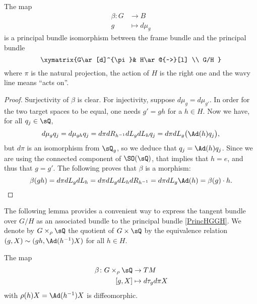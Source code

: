 \begin{proposition}
The map
\begin{equation}
\begin{aligned}
 \beta\colon G&\to B \\ 
g&\mapsto d\mu_g 
\end{aligned}
\end{equation}
is a principal bundle isomorphism between the frame bundle and the principal bundle
\begin{equation}		\label{PrincHGGH}
\xymatrix{%
   	G\ar[d]^{\pi}& H\ar@{~>}[l]		\\
   					G/H
 }
\end{equation}
where $\pi$ is the natural projection, the action of $H$ is the right one and the wavy line means ``acts on''.
\end{proposition}

\begin{proof}
Surjectivity of $\beta$ is clear. For injectivity, suppose $d\mu_g=d\mu_{g'}$. In order for the two target spaces to be equal, one needs $g'=gh$ for a $h\in H$. Now we have, for all $q_j\in\sQ$, 
\begin{equation}
  d\mu_gq_j=d\mu_{gh}q_j=d\pi dR_{h^{-1}}dL_gdL_hq_j
		=d\pi dL_g\big( \Ad(h)q_j \big),
\end{equation}
but $d\pi$ is an isomorphism from $\sQ_g$, so we deduce that $q_j=\Ad(h)q_j$. Since we are using the connected component of $\SO(\sQ)$, that implies that $h=e$, and thus that $g=g'$. The following proves that $\beta$ is a morphism:
\[ 
  \beta(gh)=d\pi dL_g dL_h=d\pi dL_g dL_h dR_{h^{-1}}=d\pi dL_g \Ad(h)=\beta(g)\cdot h.
\]
\end{proof}

The following lemma provides  a convenient way to express the tangent bundle over $G/H$ as an associated bundle to the principal bundle \eqref{PrincHGGH}. We denote by $G\times_{\rho} \sQ$ the quotient of $G\times\sQ$ by the equivalence relation $(g,X)\sim(gh,\Ad(h^{-1})X)$ for all $h\in H$.

\begin{lemma}  
The map 
\begin{equation} 
\begin{aligned}
 \beta\colon G\times_{\rho}\sQ&\to TM \\ 
[g,X]&\mapsto d\tau_gd\pi X 
\end{aligned}
\end{equation}
with $\rho(h)X=\Ad(h^{-1})X$ is diffeomorphic. 
\label{LemBazHGGH}
\end{lemma}


